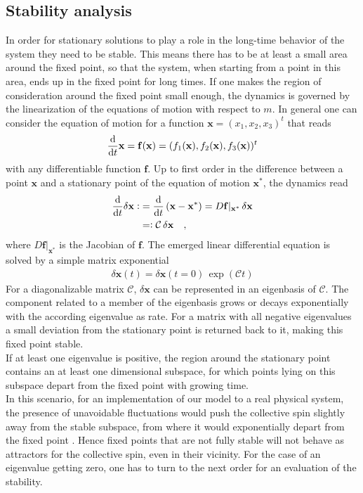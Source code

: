 \subsection{Stability analysis}
In order for stationary solutions to play a role in the long-time behavior of the system they need to be stable. This means there has to be at least a small area around the fixed point, so that the system, when starting from a point in this area, ends up in the fixed point for long times. If one makes the region of consideration around the fixed point small enough, the dynamics is governed by the linearization of the equations of motion with respect to $m$. In general one can consider the equation of motion for a function $\mathbf{x}=(x_1,x_2,x_3)^t$ that reads
\begin{align*}
    \frac{\text{d}}{\text{d}t} \mathbf{x}=\mathbf{f}(\mathbf{x})=(f_1(\mathbf{x}),f_2(\mathbf{x}),f_3(\mathbf{x}))^t
\end{align*}
with any differentiable function $\mathbf{f}$. Up to first order in the difference between a point $\mathbf{x}$ and a stationary point of the equation of motion $\mathbf{x}^*$, the dynamics read 
\begin{align*}
    \frac{\text{d}}{\text{d}t} \delta\mathbf{x} \vcentcolon&= \frac{\text{d}}{\text{d}t}\,(\mathbf{x}-\mathbf{x}^*)=D\mathbf{f}|_{\mathbf{x}^*}\,\delta\mathbf{x}\\
    &=\vcentcolon\mathcal{C}\,\delta\mathbf{x}\quad,
\end{align*}
where $D\mathbf{f}|_{\mathbf{x}^*}$ is the Jacobian of $\mathbf{f}$. The emerged linear differential equation is solved by a simple matrix exponential
\begin{align*}
    \delta\mathbf{x}(t)=\delta\mathbf{x}(t=0)\,\exp(\mathcal{C}t)
\end{align*}
For a diagonalizable matrix $\mathcal{C}$, $\delta\mathbf{x}$ can be represented in an eigenbasis of $\mathcal{C}$. The component related to a member of the eigenbasis grows or decays exponentially with the according eigenvalue as rate. For a matrix with all negative eigenvalues a small deviation from the stationary point is returned back to it, making this fixed point stable. \\If at least one eigenvalue is positive, the region around the stationary point contains an at least one dimensional subspace, for which points lying on this subspace depart from the fixed point with growing time. \\In this scenario, for an implementation of our model to a real physical system, the presence of unavoidable fluctuations would push the collective spin slightly away from the stable subspace, from where it would exponentially depart from the fixed point \cite{pikovskij_synchronization_2007}. Hence fixed points that are not fully stable will not behave as attractors for the collective spin, even in their vicinity. For the case of an eigenvalue getting zero, one has to turn to the next order for an evaluation of the stability.\\\\
